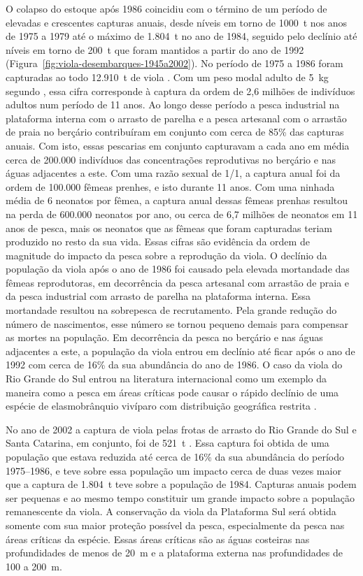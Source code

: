 \documentclass[a4paper,11pt,twoside,showtrims,onecolumn,openright,final]{memoir}
\begin{document}
O colapso do estoque após 1986 coincidiu com o término de um período de elevadas 
e crescentes capturas anuais, desde níveis em torno de 1000~t nos anos de 1975 a 1979 
até o máximo de 1.804~t no ano de 1984, seguido pelo declínio até níveis em torno de 200~t 
que foram mantidos a partir do ano de 1992 (Figura~\ref{fig:viola-desembarques-1945a2002}). 
No período de 1975 a 1986 foram capturadas ao todo 12.910~t de viola \citep{miranda2003}. 
Com um peso modal adulto de 5~kg segundo \citet{lessa1982}, %
essa cifra corresponde à captura da ordem de 2,6 milhões de indivíduos adultos num 
período de 11 anos. Ao longo desse período a pesca industrial na plataforma interna  
com o arrasto de parelha e a pesca artesanal com o arrastão de praia no berçário contribuíram 
em conjunto com cerca de 85\% das capturas anuais. Com isto, essas pescarias em conjunto 
capturavam a cada ano em média cerca de 200.000 indivíduos das concentrações reprodutivas 
no berçário e nas águas adjacentes a este. Com uma razão sexual de 1/1,  a captura anual 
foi da ordem de 100.000 fêmeas prenhes, e isto durante 11 anos. Com uma ninhada média 
de 6 neonatos por fêmea,  a captura anual dessas fêmeas prenhas resultou na perda 
de 600.000 neonatos por ano, ou cerca de 6,7 milhões de neonatos em 11 anos de pesca, 
mais os neonatos que as fêmeas que foram capturadas teriam produzido no resto da sua vida. 
Essas cifras são evidência da ordem de magnitude do impacto da pesca  sobre a 
reprodução da viola. O declínio da população da viola após o ano de 1986 foi causado 
pela elevada mortandade das fêmeas reprodutoras, em decorrência da pesca artesanal 
com arrastão de praia e da pesca industrial com arrasto de parelha na plataforma interna. 
Essa mortandade resultou na sobrepesca de recrutamento. Pela grande redução do número 
de nascimentos, esse número se tornou pequeno demais para compensar as mortes na população. 
Em decorrência da pesca no berçário e nas águas adjacentes a este, a população da viola 
entrou em declínio até ficar após o ano de 1992 com cerca de 16\% da sua abundância do ano 
de 1986. O caso da viola do Rio Grande do Sul entrou na literatura internacional como um 
exemplo da maneira como a pesca em áreas críticas pode causar o rápido declínio de uma 
espécie de elasmobrânquio vivíparo com distribuição geográfica restrita \citep{camhi1998}. %

No ano de 2002 a captura de viola pelas frotas de arrasto do Rio Grande do Sul 
e Santa Catarina, em conjunto, foi de 521~t \citep{univali2003,ceperg2003}. %
Essa captura foi obtida de uma população que estava reduzida até cerca de 
16\% da sua abundância do período 1975--1986, e teve sobre essa população um impacto 
cerca de duas vezes maior que a captura de 1.804~t teve sobre a população de 1984. 
Capturas anuais podem ser pequenas e ao mesmo tempo constituir um grande impacto sobre 
a população remanescente da viola. A conservação da viola da Plataforma Sul 
será obtida somente com sua maior proteção possível da pesca, 
especialmente da pesca nas áreas críticas da espécie. Essas áreas críticas são as 
águas costeiras nas profundidades de menos de 20~m e a plataforma externa 
nas profundidades de 100 a 200~m. 
\end{document}
